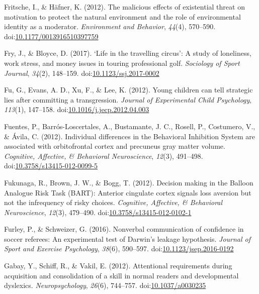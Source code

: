 \documentclass[english,man]{apa6}
\theoremstyle{definition}
\theoremstyle{definition}
\theoremstyle{definition}
\theoremstyle{remark}
\begin{document}
\hypertarget{ref-Fritsche2012}{}
Fritsche, I., \& Häfner, K. (2012). The malicious effects of existential
threat on motivation to protect the natural environment and the role of
environmental identity as a moderator. \emph{Environment and Behavior},
\emph{44}(4), 570--590.
doi:\href{https://doi.org/10.1177/0013916510397759}{10.1177/0013916510397759}

\hypertarget{ref-Fry2017}{}
Fry, J., \& Bloyce, D. (2017). `Life in the travelling circus': A study
of loneliness, work stress, and money issues in touring professional
golf. \emph{Sociology of Sport Journal}, \emph{34}(2), 148--159.
doi:\href{https://doi.org/10.1123/ssj.2017-0002}{10.1123/ssj.2017-0002}

\hypertarget{ref-Fu2012}{}
Fu, G., Evans, A. D., Xu, F., \& Lee, K. (2012). Young children can tell
strategic lies after committing a transgression. \emph{Journal of
Experimental Child Psychology}, \emph{113}(1), 147--158.
doi:\href{https://doi.org/10.1016/j.jecp.2012.04.003}{10.1016/j.jecp.2012.04.003}

\hypertarget{ref-Fuentes2012}{}
Fuentes, P., Barrós-Loscertales, A., Bustamante, J. C., Rosell, P.,
Costumero, V., \& Ávila, C. (2012). Individual differences in the
Behavioral Inhibition System are associated with orbitofrontal cortex
and precuneus gray matter volume. \emph{Cognitive, Affective, \&
Behavioral Neuroscience}, \emph{12}(3), 491--498.
doi:\href{https://doi.org/10.3758/s13415-012-0099-5}{10.3758/s13415-012-0099-5}

\hypertarget{ref-Fukunaga2012}{}
Fukunaga, R., Brown, J. W., \& Bogg, T. (2012). Decision making in the
Balloon Analogue Risk Task (BART): Anterior cingulate cortex signals
loss aversion but not the infrequency of risky choices. \emph{Cognitive,
Affective, \& Behavioral Neuroscience}, \emph{12}(3), 479--490.
doi:\href{https://doi.org/10.3758/s13415-012-0102-1}{10.3758/s13415-012-0102-1}

\hypertarget{ref-Furley2016}{}
Furley, P., \& Schweizer, G. (2016). Nonverbal communication of
confidence in soccer referees: An experimental test of Darwin's leakage
hypothesis. \emph{Journal of Sport and Exercise Psychology},
\emph{38}(6), 590--597.
doi:\href{https://doi.org/10.1123/jsep.2016-0192}{10.1123/jsep.2016-0192}

\hypertarget{ref-Gabay2012}{}
Gabay, Y., Schiff, R., \& Vakil, E. (2012). Attentional requirements
during acquisition and consolidation of a skill in normal readers and
developmental dyslexics. \emph{Neuropsychology}, \emph{26}(6), 744--757.
doi:\href{https://doi.org/10.1037/a0030235}{10.1037/a0030235}
\end{document}
